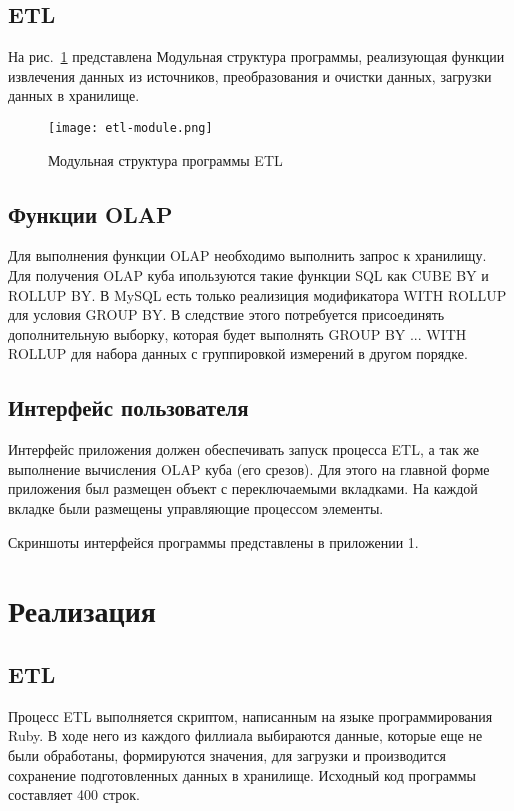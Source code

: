 \subsection{ETL}
На рис.~\ref{etl-module} представлена Модульная структура программы, реализующая функции извлечения данных из источников, преобразования и очистки данных, загрузки данных в хранилище.
\begin{figure}[h]
  \centering
  \texttt{[image: etl-module.png]}
  \caption{Модульная структура программы ETL}
  \label{etl-module}
\end{figure}
\subsection{Функции OLAP}
Для выполнения функции OLAP необходимо выполнить запрос к хранилищу. Для получения OLAP куба ипользуются такие функции SQL как CUBE BY и ROLLUP BY. В MySQL есть только реализиция модификатора WITH ROLLUP для условия GROUP BY. В следствие этого потребуется присоединять дополнительную выборку, которая будет выполнять GROUP BY ... WITH ROLLUP для набора данных с группировкой измерений в другом порядке.
\subsection{Интерфейс пользователя}
Интерфейс приложения должен обеспечивать запуск процесса ETL, а так же выполнение вычисления OLAP куба (его срезов). Для этого на главной форме приложения был размещен объект с переключаемыми вкладками. На каждой вкладке были размещены управляющие процессом элементы.\par
Скриншоты интерфейся программы представлены в приложении 1.
\section{Реализация}
\subsection{ETL}
Процесс ETL выполняется скриптом, написанным на языке программирования Ruby. В ходе него из каждого филлиала выбираются данные, которые еще не были обработаны, формируются значения, для загрузки и производится сохранение подготовленных данных в хранилище. Исходный код программы составляет 400 строк.

